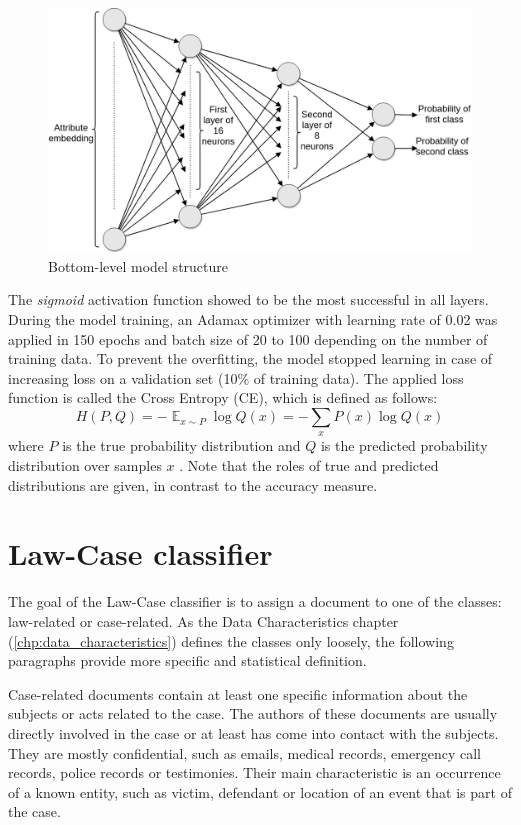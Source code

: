 \documentclass[
  digital, %
  notable,   %
  nolof,     %
  nolot,     %
]{fithesis3}
\DeclareMathOperator{\EX}{\mathbb{E}}%
\begin{document}
\begin{figure}[H]
\caption{Bottom-level model structure}
\label{fig:neural-network}
\includegraphics[width=\textwidth]{img/Bottom-level_NN}
\end{figure}

The \textit{sigmoid} activation function showed to be the most successful in all layers.
During the model training, an Adamax optimizer with learning rate of 0.02 was applied in 150 epochs and batch size of 20 to 100 depending on the number of training data.
To prevent the overfitting, the model stopped learning in case of increasing loss on a validation set (10\% of training data).
The applied loss function is called the Cross Entropy (CE), which is defined as follows:
$$
H(P, Q) = -\EX_{x \sim P} \log{Q(x)} = -\sum_x P(x) \log{Q(x)}
$$
where $P$ is the true probability distribution and $Q$ is the predicted probability distribution over samples $x$ \cite{Goodfellow-et-al-2016}.
Note that the roles of true and predicted distributions are given, in contrast to the accuracy measure.

\section{Law-Case classifier}
\label{sec:law-case-classifier}
The goal of the Law-Case classifier is to assign a document to one of the classes: law-related or case-related.
As the Data Characteristics chapter (\ref{chp:data_characteristics}) defines the classes only loosely, the following paragraphs provide more specific and statistical definition.

Case-related documents contain at least one specific information about the subjects or acts related to the case. 
The authors of these documents are usually directly involved in the case or at least has come into contact with the subjects.
They are mostly confidential, such as emails, medical records, emergency call records, police records or testimonies.
Their main characteristic is an occurrence of a known entity, such as victim, defendant or location of an event that is part of the case.
\end{document}
